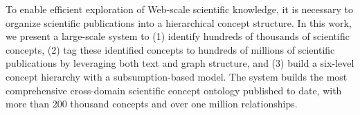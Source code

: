 To enable efficient exploration of Web-scale scientific knowledge, it is necessary to organize scientific publications into a hierarchical concept structure. In this work, we present a large-scale system to (1) identify hundreds of thousands of scientific concepts, (2) tag these identified concepts to hundreds of millions of scientific publications by leveraging both text and graph structure, and (3) build a six-level concept hierarchy with a subsumption-based model. The system builds the most comprehensive cross-domain scientific concept ontology published to date, with more than 200 thousand concepts and over one million relationships.
